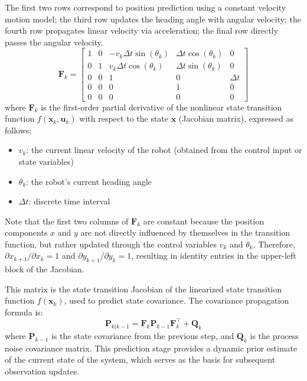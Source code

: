 \documentclass[12pt,a4paper]{article}
\numberwithin{equation}{section}
\begin{document}
The first two rows correspond to position prediction using a constant velocity
motion model; the third row updates the heading angle with angular velocity; the
fourth row propagates linear velocity via acceleration; the final row directly
passes the angular velocity.
\begin{equation}
  \mathbf{F}_k = 
  \begin{bmatrix}
    1 & 0 & -v_k \Delta t \sin(\theta_k) & \Delta t \cos(\theta_k) & 0 \\
    0 & 1 & v_k \Delta t \cos(\theta_k) & \Delta t \sin(\theta_k) & 0 \\
    0 & 0 & 1 & 0 & \Delta t \\
    0 & 0 & 0 & 1 & 0 \\
    0 & 0 & 0 & 0 & 0
  \end{bmatrix}
  \label{eq:jacobian_F}
\end{equation}
where $\mathbf{F}_k$ is the first-order partial derivative of the nonlinear
state transition function $f(\mathbf{x}_k, \mathbf{u}_k)$ with respect to the
state $\mathbf{x}$ (Jacobian matrix), expressed as follows:
\begin{itemize}
\item $v_k$: the current linear velocity of the robot (obtained from the control
  input or state variables)
\item $\theta_k$: the robot's current heading angle
\item $\Delta t$: discrete time interval
\end{itemize}

Note that the first two columns of $\mathbf{F}_k$ are constant because the
position components $x$ and $y$ are not directly influenced by themselves in the
transition function, but rather updated through the control variables $v_k$ and
$\theta_k$. Therefore, $\partial x_{k+1} / \partial x_k = 1$ and
$\partial y_{k+1} / \partial y_k = 1$, resulting in identity entries in the
upper-left block of the Jacobian.

This matrix is the state transition Jacobian of the linearized state transition
function $f(\mathbf{x}_k)$, used to predict state covariance.  The covariance
propagation formula is:
\begin{equation}
  \mathbf{P}_{k|k-1} = \mathbf{F}_k \mathbf{P}_{k-1} \mathbf{F}_k^\top + \mathbf{Q}_k
  \label{eq:cov_prediction}
\end{equation}
where $\mathbf{P}_{k-1}$ is the state covariance from the previous step, and
$\mathbf{Q}_k$ is the process noise covariance matrix. This prediction stage
provides a dynamic prior estimate of the current state of the system, which
serves as the basis for subsequent observation updates.
\end{document}

